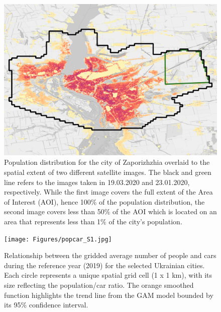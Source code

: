 \documentclass[sn-basic]{sn-jnl}%
\begin{document}
{\begin{appendices}
\begin{figure}[h!]
\begin{center}
\includegraphics[width = \textwidth]{Figures/SM_Pop_coverage.png}
\end{center}
\caption{Population distribution for the city of Zaporizhzhia overlaid to the spatial extent of two different satellite images. The black and green line refers to the images taken in 19.03.2020 and 23.01.2020, respectively. While the first image covers the full extent of the Area of Interest (AOI), hence 100\% of the population distribution, the second image covers less than 50\% of the AOI which is located on an area that represents less than 1\% of the city's population. }
\label{SM_pop_coverage}
\end{figure}






\begin{figure}[h!]
\begin{center}
\texttt{[image: Figures/popcar\_S1.jpg]}
\end{center}
\caption{Relationship between the gridded average number of people and cars during the reference year (2019) for the selected Ukrainian cities. Each circle represents a unique spatial grid cell (1 x 1 km), with its size reflecting the population/car ratio. The orange smoothed function highlights the trend line from the GAM model bounded by its 95\% confidence interval.}
\label{figSM_PopCar_01}
\end{figure}



\end{appendices}}
\end{document}
